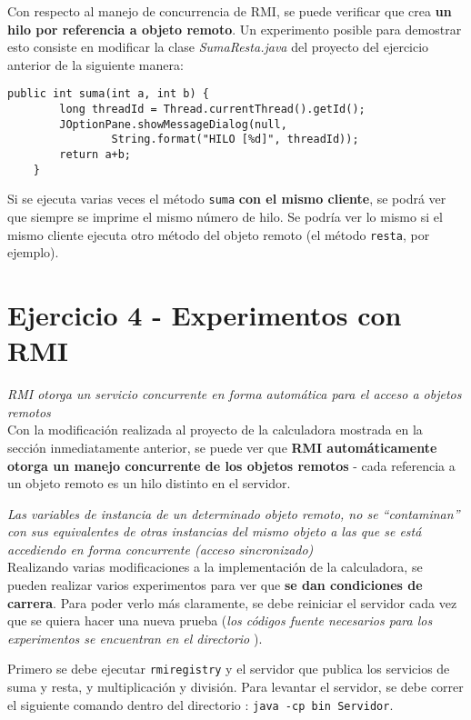 Con respecto al manejo de concurrencia de RMI, se puede verificar que crea \textbf{un hilo por referencia a objeto remoto}. Un experimento posible para demostrar esto consiste en modificar la clase \emph{SumaResta.java} del proyecto del ejercicio anterior de la siguiente manera:

\begin{lstlisting}[title={Modificar el método \texttt{suma} para poder ver el hilo en el que corre}]
    public int suma(int a, int b) {
        long threadId = Thread.currentThread().getId();
        JOptionPane.showMessageDialog(null, 
                String.format("HILO [%d]", threadId));
        return a+b;
    }
\end{lstlisting}

Si se ejecuta varias veces el método \texttt{suma} \textbf{con el mismo cliente}, se podrá ver que siempre se imprime el mismo número de hilo. Se podría ver lo mismo si el mismo cliente ejecuta otro método del objeto remoto (el método \texttt{resta}, por ejemplo).  

\section{Ejercicio 4 - Experimentos con RMI}

\emph{RMI otorga un servicio concurrente en forma automática para el acceso a objetos remotos} 
~\\

Con la modificación realizada al proyecto de la calculadora mostrada en la sección inmediatamente anterior, se puede ver que \textbf{RMI automáticamente otorga un manejo concurrente de los objetos remotos} - cada referencia a un objeto remoto es un hilo distinto en el servidor.

\emph{Las variables de instancia de un determinado objeto remoto, no se “contaminan” con sus equivalentes de otras instancias del mismo objeto a las que se está accediendo en forma concurrente (acceso sincronizado)} 
~\\

Realizando varias modificaciones a la implementación de la calculadora, se pueden realizar varios experimentos para ver que \textbf{se dan condiciones de carrera}. Para poder verlo más claramente, se debe reiniciar el servidor cada vez que se quiera hacer una nueva prueba (\emph{los códigos fuente necesarios para los experimentos se encuentran en el directorio }).

Primero se debe ejecutar \texttt{rmiregistry} y el servidor que publica los servicios de suma y resta, y multiplicación y división. Para levantar el servidor, se debe correr el siguiente comando dentro del directorio : \texttt{java -cp bin Servidor}. 

